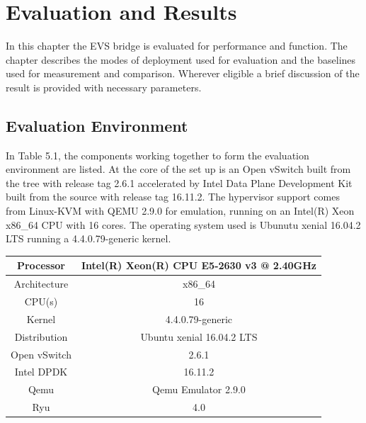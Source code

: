 \chapter{Evaluation and Results}
In this chapter the EVS bridge is evaluated for performance and function. The chapter describes the modes of deployment used for evaluation and the baselines used for measurement and comparison. Wherever eligible a brief discussion of the result is provided with necessary parameters. 


\section{Evaluation Environment}
In Table 5.1, the components working together to form the evaluation environment are listed. At the core of the set up is an Open vSwitch built from the tree with release tag 2.6.1 accelerated by Intel Data Plane Development Kit built from the source with release tag 16.11.2. The hypervisor support comes from Linux-KVM with QEMU 2.9.0 for emulation, running on an Intel(R) Xeon x86_64 CPU with 16 cores. The operating system used is Ubunutu xenial 16.04.2 LTS running a 4.4.0.79-generic kernel. 
\begin{center}
	 \label{tab:title} 
	\begin{tabular}{ |c|c| } 
		\hline
		Processor &  Intel(R) Xeon(R) CPU E5-2630 v3 @ 2.40GHz  \\
		\hline 
		Architecture &  x86_64  \\ 
		\hline
		CPU(s) & 16  \\ 
		\hline
		Kernel & 4.4.0.79-generic \\
		\hline
		Distribution & Ubuntu xenial 16.04.2 LTS \\
		\hline
		Open vSwitch & 2.6.1 \\
		\hline
		Intel DPDK & 16.11.2 \\
		\hline
		Qemu & Qemu Emulator 2.9.0 \\
		\hline
		Ryu & 4.0 \\
		\hline		
	\end{tabular}
\end{center}

